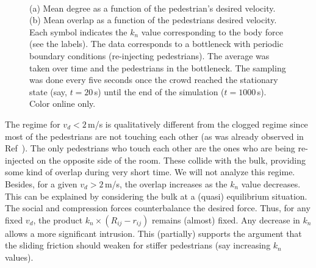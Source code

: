 \documentclass[preprint,12pt]{elsarticle}
\begin{document}
\begin{figure}[!htbp]
\centering
{}\ 
\\
\caption[width=0.47\columnwidth]{(a) Mean degree as a function of the
pedestrian’s desired velocity. (b) Mean overlap as a function of the
pedestrians desired velocity. Each symbol indicates the $k_n$ value
corresponding to the body force (see the labels). The data corresponds to a
bottleneck with periodic boundary conditions (re-injecting pedestrians). The
average was taken over time and the pedestrians in the bottleneck. The sampling
was done every five seconds once the crowd reached the stationary state (say,
$t=20\,$s) until the end of the simulation ($t=1000\,$s). Color online only.}
\label{degree_overlap_vd}
\end{figure}

The regime for $v_d<2\,$m/s is qualitatively different from the clogged regime
since most of the  pedestrians are not touching each other (as was already
observed in Ref~\cite{dorso_2005,dorso_2011}). The only pedestrians who touch
each  other are the ones who are being re-injected on the opposite side of the
room. These collide with the bulk, providing some kind of overlap during very
short time. We will not analyze this regime.\\

Besides, for a given $v_d>2\,$m/s, the overlap increases as the $k_n$ value
decreases.  This can be explained by considering the bulk at a (quasi)
equilibrium situation.  The social and compression forces counterbalance the
desired force. Thus, for any fixed $v_d$, the product $k_n \times
(R_{ij}-r_{ij})$ remains (almost) fixed. Any decrease in $k_n$ allows a more
significant intrusion. This (partially) supports the argument that the sliding
friction should weaken for stiffer pedestrians (say increasing $k_n$ values). \\
\end{document}
